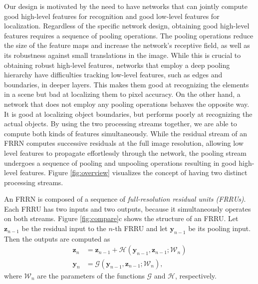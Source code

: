 \documentclass[10pt,twocolumn,letterpaper]{article}
\newcommand{\bz}{\mathbf{z}}
\newcommand{\by}{\mathbf{y}}
\begin{document}
Our design is motivated by the need to have networks that can jointly compute good high-level features for recognition and good low-level features for localization.
Regardless of the specific network design, obtaining good high-level features requires a sequence of pooling operations.
The pooling operations reduce the size of the feature maps and increase the network's receptive field, as well as its robustness against small translations in the image.
While this is crucial to obtaining robust high-level features, networks that employ a deep pooling hierarchy have difficulties tracking low-level features, such as edges and boundaries, in deeper layers.
This makes them good at recognizing the elements in a scene but bad at localizing them to pixel accuracy.
On the other hand, a network that does not employ any pooling operations behaves the opposite way.
It is good at localizing object boundaries, but performs poorly at recognizing the actual objects.
By using the two processing streams together, we are able to compute both kinds of features simultaneously.
While the residual stream of an FRRN computes successive residuals at the full image resolution, allowing low level features to propagate effortlessly through the network,
the pooling stream undergoes a sequence of pooling and unpooling operations resulting in good high-level features.
Figure \ref{fig:overview} visualizes the concept of having two distinct processing streams.

An FRRN is composed of a sequence of \emph{full-resolution residual units (FRRUs)}.
Each FRRU has two inputs and two outputs, because it simultaneously operates on both streams.
Figure \ref{fig:compare}c shows the structure of an FRRU.
Let $\bz_{n-1}$ be the residual input to the $n$-th FRRU and let $\by_{n-1}$ be its pooling input.
Then the outputs are computed as
\begin{align}
	\bz_{n} & = \bz_{n - 1} + \mathcal{H}(\by_{n-1}, \bz_{n-1}; \mathcal{W}_n)\\
	\by_{n} & = \mathcal{G}(\by_{n-1}, \bz_{n-1}; \mathcal{W}_n),
\end{align}
where $\mathcal{W}_n$ are the parameters of the functions $\mathcal{G}$ and $\mathcal{H}$, respectively.
\end{document}
